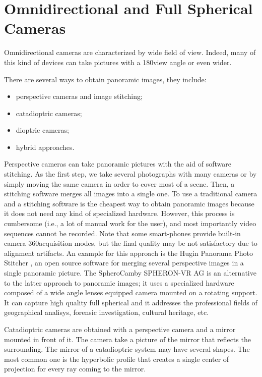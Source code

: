 \section{Omnidirectional and Full Spherical Cameras}
\label{sec:cameraclassification}
Omnidirectional cameras are characterized by wide field of view. Indeed, many of this kind of devices can take pictures with a 180\degree view angle or even wider.

There are several ways to obtain panoramic images, they include:
\begin{itemize}
	\item perspective cameras and image stitching;
	\item catadioptric cameras;
	\item dioptric cameras;
	\item hybrid approaches.
\end{itemize}

Perspective cameras can take panoramic pictures with the aid of software stitching. As the first step, we take several photographs with many cameras or by simply moving the same camera in order to cover most of a scene. Then, a stitching software merges all images into a single one. To use a traditional camera and a stitching software is the cheapest way to obtain panoramic images because it does not need any kind of specialized hardware. However, this process is cumbersome (i.e., a lot of manual work for the user), and most importantly video sequences cannot be recorded. Note that some smart-phones provide built-in camera 360\degree acquisition modes, but the final quality may be not satisfactory due to alignment artifacts.
An example for this approach is the Hugin Panorama Photo Stitcher 
\cite{hugin_photostitcher}, an open source software for merging several 
perspective images in a single panoramic picture.
The SpheroCam\texttrademark by SPHERON-VR AG\texttrademark \cite{spheronvr}
is an alternative to 
the latter approach to panoramic images; it uses a specialized hardware composed
of a wide angle lenses equipped camera mounted on a rotating support. It can 
capture high quality full spherical and it addresses the professional fields of 
geographical analisys, forensic investigation, cultural heritage, etc.


Catadioptric cameras are obtained with a perspective camera and a mirror mounted in front of it. The camera take a picture of the mirror that reflects the surrounding. The mirror of a catadioptric system may have several shapes. The most common one is the hyperbolic profile that creates a single center of 
projection for every ray coming to the mirror.

